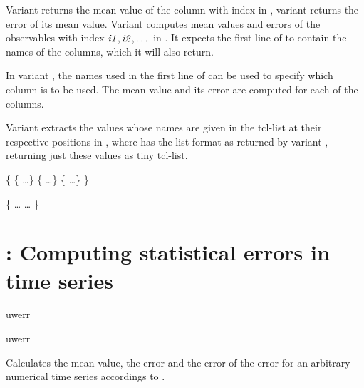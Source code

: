 \begin{essyntex}
Variant  returns the mean value of the column with index
 in , variant  returns the error of
its mean value. Variant  computes mean values and errors of
the observables with index $\mbox{\textrm{\textit{i1}}}, \mbox{\textrm{\textit{i2}}}, \dots$ in
. It expects the first line of  to contain the
names of the columns, which it will also return.

In variant , the names used in the first line of 
can be used to specify which column is to be used.  The mean value and
its error are computed for each of the columns.

  Variant  extracts the values whose names are
given in the tcl-list  at their respective positions in
, where  has the list-format as returned by
variant , returning just these values as tiny tcl-list.


\begin{code}
\{
  \{   \dots \}
  \{   \dots \} 
  \{   \dots \}
\}
\end{code}


\begin{code}
\{
    \dots
    \dots
\}
\end{code}

\section{: Computing statistical errors in time series}

\begin{essyntax}
   uwerr   
    

   uwerr   
    
\end{essyntax}
Calculates the mean value, the error and the error of the error for an
arbitrary numerical time series accordings to \citet{wolff04a}.


\end{essyntex}
